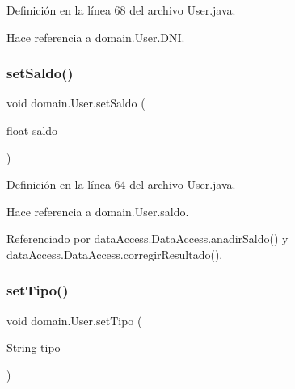 Definición en la línea 68 del archivo User.\+java.


\begin{DoxyCode}{0}

\end{DoxyCode}


Hace referencia a domain.\+User.\+D\+NI.

\mbox{\label{classdomain_1_1User_ab0da73a44b69fbb13668ec2093e8d3e7}} 
\subsubsection{\texorpdfstring{setSaldo()}{setSaldo()}}
{\footnotesize\ttfamily void domain.\+User.\+set\+Saldo (\begin{DoxyParamCaption}\item[{float}]{saldo }\end{DoxyParamCaption})}



Definición en la línea 64 del archivo User.\+java.


\begin{DoxyCode}{0}

\end{DoxyCode}


Hace referencia a domain.\+User.\+saldo.



Referenciado por data\+Access.\+Data\+Access.\+anadir\+Saldo() y data\+Access.\+Data\+Access.\+corregir\+Resultado().

\mbox{\label{classdomain_1_1User_aa5010bb10a4aaacd7731ca313e2ae6ce}} 
\subsubsection{\texorpdfstring{setTipo()}{setTipo()}}
{\footnotesize\ttfamily void domain.\+User.\+set\+Tipo (\begin{DoxyParamCaption}\item[{String}]{tipo }\end{DoxyParamCaption})}




